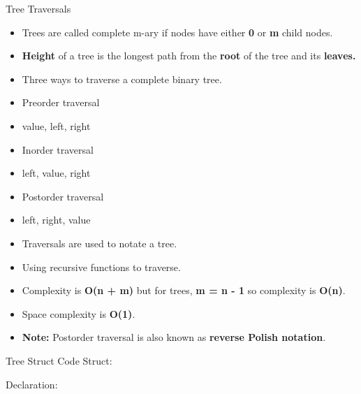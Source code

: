 \documentclass[aspectratio=169]{beamer}%
\begin{document}
\begin{frame}{Tree Traversals}
    \begin{itemize}
        \item Trees are called complete m-ary if nodes have either \textbf{0} or \textbf{m} child nodes.
        \item \textbf{Height} of a tree is the longest path from the \textbf{root} of the tree and its \textbf{leaves.}
        \item Three ways to traverse a complete binary tree.
    \end{itemize}
    \begin{multicols}{3}
        \begin{itemize}
            \item Preorder traversal
            \item value, left, right
            \item Inorder traversal
            \item left, value, right
            \item Postorder traversal
            \item left, right, value
        \end{itemize}
    \end{multicols}
    \begin{itemize}
        \item Traversals are used to notate a tree.
        \item Using recursive functions to traverse.
        \item Complexity is \textbf{O(n + m)} but for trees, \textbf{m = n - 1} so complexity is \textbf{O(n)}.
        \item Space complexity is \textbf{O(1)}.
        \item \textbf{Note:} Postorder traversal is also known as \textbf{reverse Polish notation}.
    \end{itemize}    
\end{frame}

\begin{frame}{Tree Struct Code}
    Struct:
    
    Declaration:
    
\end{frame}
\end{document}
